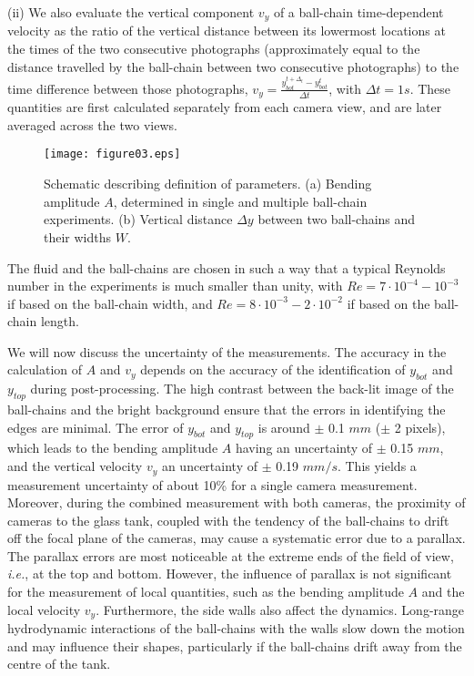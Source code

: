 \documentclass{article}
\begin{document}
(ii) We also evaluate the vertical component $v_y$ of a ball-chain time-dependent velocity as the ratio of the vertical distance 
between its %
lowermost locations at the times of the two consecutive photographs (approximately equal to the distance travelled by the ball-chain between two consecutive photographs) 
to the time difference between those photographs, $v_y = \frac{y_{bot}^{t + \Delta_t} - y_{bot}^{t}}{\Delta t}$, with $\Delta t = 1 s$. 
These quantities are first calculated separately from each camera view, and are later averaged across the two views.
\begin{figure}[h!]
    \centering \vspace{-.4cm}
    \texttt{[image: figure03.eps]}
    \vspace{-.4cm}
    \caption{
    Schematic describing %
    definition of parameters. 
    (a) Bending amplitude $A$, determined in 
    single and multiple ball-chain experiments.
    (b) Vertical distance $\Delta y$ between
    two ball-chains and their widths $W$.
    }
    \label{fig:figure1a}
\end{figure}

The fluid and the ball-chains are chosen in such a way that a typical Reynolds number in the experiments is much smaller than unity, with 
$Re=7 \cdot 10^{-4}-10^{-3}$ 
if based on the ball-chain width, and 
$Re=8 \cdot 10^{-3}-2\cdot 10^{-2}$ 
if based on the ball-chain length. 

We will now discuss the uncertainty of the measurements. 
The accuracy in the calculation of $A$ and $v_y$ depends on the accuracy of the identification of $y_{bot}$ and $y_{top}$ during post-processing. The high contrast %
between the back-lit image %
of the ball-chains and the bright background %
ensure that the errors in identifying the edges are minimal. The error of $y_{bot}$ and $y_{top}$ is around $\pm$ 0.1 $mm$ ($\pm$ 2 pixels), which leads to the bending amplitude $A$ having an uncertainty of $\pm$ 0.15 $mm$, and the vertical velocity $v_y$ an uncertainty of $\pm$ 0.19 $mm/s$. This yields a measurement uncertainty of about 10\% for a single camera measurement. Moreover, during the combined measurement with both cameras, the proximity of cameras to the glass tank, coupled with the tendency of the ball-chains to drift off the focal plane of the cameras, %
may cause a systematic %
error due to a parallax. The parallax errors are most noticeable at the extreme ends of the field of view, \textit{i.e.}, at the top and bottom. %
However, the influence of parallax is not significant for the measurement of local quantities, such as the bending amplitude %
$A$ and the local velocity $v_y$. %
Furthermore, the side walls %
also affect the dynamics. Long-range hydrodynamic interactions of the ball-chains with the walls slow down the motion and may influence their shapes, particularly if the ball-chains drift away from the centre of the tank.
\end{document}
